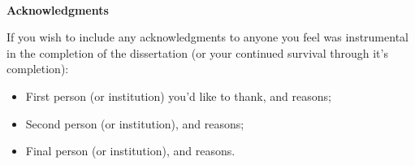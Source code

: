 \ 


\newpage

\begin{center}{\Large\bf Acknowledgments}\end{center}

\vspace{0.3cm}

\noindent If you wish to include any acknowledgments to anyone you feel was instrumental in the completion of the dissertation (or your continued survival through it's completion):
\begin{itemize}
	\item First person (or institution) you'd like to thank, and reasons;

	\item Second person (or institution), and reasons;

	\item Final person (or institution), and reasons.
\end{itemize}


\cleardoublepage
\pagestyle{plain}
\setcounter{page}{1}
\tableofcontents


\cleardoublepage
{}
{}
\listoffigures


\cleardoublepage
{}
{}


\cleardoublepage
{}
{}


\cleardoublepage
{}
{}
\listoftables

